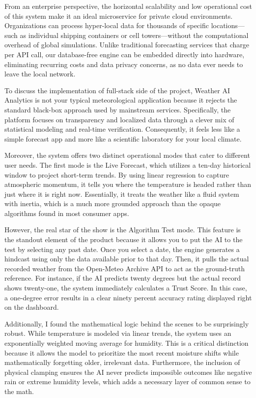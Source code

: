 \documentclass[14pt]{extarticle}
\begin{document}
\medskip

\noindent From an enterprise perspective, the horizontal scalability and low operational cost of this system make it an ideal microservice for private cloud environments. Organizations can process hyper-local data for thousands of specific locations—such as individual shipping containers or cell towers—without the computational overhead of global simulations. Unlike traditional forecasting services that charge per API call, our database-free engine can be embedded directly into hardware, eliminating recurring costs and data privacy concerns, as no data ever needs to leave the local network.

\medskip

\noindent To discuss the implementation of full-stack side of the project,
Weather AI Analytics is not your typical meteorological application because it
rejects the standard black-box approach used by mainstream services.
Specifically, the platform focuses on transparency and localized data through a
clever mix of statistical modeling and real-time verification. Consequently, it
feels less like a simple forecast app and more like a scientific laboratory for
your local climate.

Moreover, the system offers two distinct operational modes that cater to
different user needs. The first mode is the Live Forecast, which utilizes a
ten-day historical window to project short-term trends. By using linear
regression to capture atmospheric momentum, it tells you where the temperature
is headed rather than just where it is right now. Essentially, it treats the
weather like a fluid system with inertia, which is a much more grounded approach
than the opaque algorithms found in most consumer apps.

However, the real star of the show is the Algorithm Test mode. This feature is
the standout element of the product because it allows you to put the AI to the
test by selecting any past date. Once you select a date, the engine generates a
hindcast using only the data available prior to that day. Then, it pulls the
actual recorded weather from the Open-Meteo Archive API to act as the
ground-truth reference. For instance, if the AI predicts twenty degrees but the
actual record shows twenty-one, the system immediately calculates a Trust Score.
In this case, a one-degree error results in a clear ninety percent accuracy
rating displayed right on the dashboard.

Additionally, I found the mathematical logic behind the scenes to be
surprisingly robust. While temperature is modeled via linear trends, the system
uses an exponentially weighted moving average for humidity. This is a critical
distinction because it allows the model to prioritize the most recent moisture
shifts while mathematically forgetting older, irrelevant data. Furthermore, the
inclusion of physical clamping ensures the AI never predicts impossible outcomes
like negative rain or extreme humidity levels, which adds a necessary layer of
common sense to the math.
\end{document}
